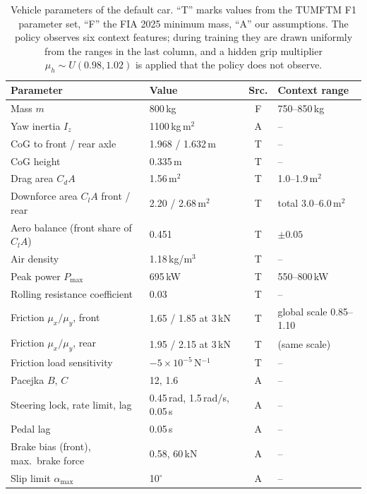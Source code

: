 \begin{table}[t]
\centering
\small
\caption{Vehicle parameters of the default car. ``T'' marks values from the TUMFTM F1
parameter set, ``F'' the FIA 2025 minimum mass, ``A'' our assumptions. The policy
observes six context features; during training they are drawn uniformly from the ranges
in the last column, and a hidden grip multiplier $\mu_h \sim U(0.98, 1.02)$ is applied that
the policy does not observe.}
\label{tab:params}
\begin{tabular}{@{}llcl@{}}
\toprule
Parameter & Value & Src. & Context range \\
\midrule
Mass $m$ & 800\,kg & F & 750--850\,kg \\
Yaw inertia $I_z$ & \num{1100}\,kg\,m$^2$ & A & -- \\
CoG to front / rear axle & 1.968 / 1.632\,m & T & -- \\
CoG height & 0.335\,m & T & -- \\
Drag area $C_dA$ & 1.56\,m$^2$ & T & 1.0--1.9\,m$^2$ \\
Downforce area $C_lA$ front / rear & 2.20 / 2.68\,m$^2$ & T & total 3.0--6.0\,m$^2$ \\
Aero balance (front share of $C_lA$) & 0.451 & T & $\pm 0.05$ \\
Air density & 1.18\,kg/m$^3$ & T & -- \\
Peak power $P_{\max}$ & 695\,kW & T & 550--800\,kW \\
Rolling resistance coefficient & 0.03 & T & -- \\
Friction $\mu_x/\mu_y$, front & 1.65 / 1.85 at 3\,kN & T & global scale 0.85--1.10 \\
Friction $\mu_x/\mu_y$, rear & 1.95 / 2.15 at 3\,kN & T & (same scale) \\
Friction load sensitivity & $-5\times10^{-5}$\,N$^{-1}$ & T & -- \\
Pacejka $B$, $C$ & 12, 1.6 & A & -- \\
Steering lock, rate limit, lag & 0.45\,rad, 1.5\,rad/s, 0.05\,s & A & -- \\
Pedal lag & 0.05\,s & A & -- \\
Brake bias (front), max.\ brake force & 0.58, 60\,kN & A & -- \\
Slip limit $\alpha_{\max}$ & 10$^\circ$ & A & -- \\
\bottomrule
\end{tabular}
\end{table}

